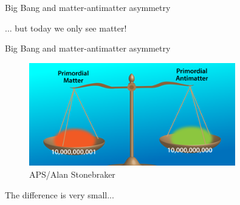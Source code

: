 \documentclass{beamer}
\begin{document}
\begin{frame}{Big Bang and matter-antimatter asymmetry}
  \begin{figure}
  \end{figure}
  \begin{center}
    \Large ... but today we only see matter!
  \end{center}
\end{frame}

\begin{frame}{Big Bang and matter-antimatter asymmetry}
  \begin{figure}
    \includegraphics[width=0.8\textwidth,trim={0.9cm 0 0.9cm 0},clip=true]{Plots/PrimordialAntimatter.png}
    \caption*{\tiny APS/Alan Stonebraker}
  \end{figure}
  \vspace{-0.5cm}
  \begin{center}
    \Large The difference is very small...
  \end{center}
\end{frame}
\end{document}
